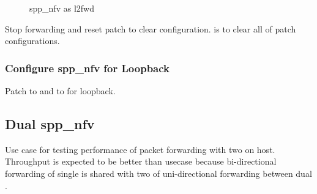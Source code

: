 \documentclass[a4paper,11pt,openany,oneside,english]{sphinxmanual}
\begin{document}
\begin{figure}[htbp]
\centering
\capstart

\noindent{}
\caption{spp\_nfv as l2fwd}\label{\detokenize{usecases/spp_nfv:id1}}\label{\detokenize{usecases/spp_nfv:figure-spp-nfv-as-l2fwd}}\end{figure}

Stop forwarding and reset patch to clear configuration.
 is to clear all of patch configurations.

\begin{sphinxVerbatim}[commandchars=\\\{\},formatcom=\footnotesize]
\end{sphinxVerbatim}


\subsubsection{Configure spp\_nfv for Loopback}
\label{\detokenize{usecases/spp_nfv:configure-spp-nfv-for-loopback}}
Patch  to  and  to 
for loopback.

\begin{sphinxVerbatim}[commandchars=\\\{\},formatcom=\footnotesize]
\end{sphinxVerbatim}


\subsection{Dual spp\_nfv}
\label{\detokenize{usecases/spp_nfv:dual-spp-nfv}}
Use case for testing performance of packet forwarding
with two  on host.
Throughput is expected to be better than
{\hyperref[\detokenize{usecases/spp_nfv:spp-usecases-nfv-single-spp-nfv}]{}}
usecase because bi-directional forwarding of single  is shared
with two of uni-directional forwarding between dual .
\end{document}
